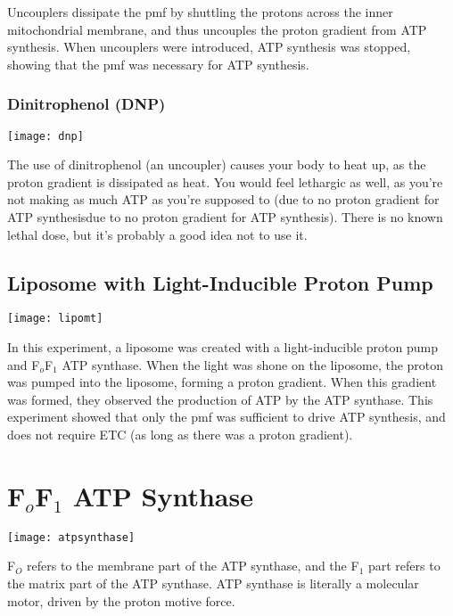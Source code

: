 Uncouplers dissipate the pmf by shuttling the protons across the inner mitochondrial membrane, and thus uncouples the proton gradient from ATP synthesis.
When uncouplers were introduced, ATP synthesis was stopped, showing that the pmf was necessary for ATP synthesis.

\subsubsection{Dinitrophenol (DNP)}

\begin{center}
\texttt{[image: dnp]}
\end{center}

The use of dinitrophenol (an uncoupler) causes your body to heat up, as the proton gradient is dissipated as heat.
You would feel lethargic as well, as you're not making as much ATP as you're supposed to (due to no proton gradient for ATP synthesisdue to no proton gradient for ATP synthesis).
There is no known lethal dose, but it's probably a good idea not to use it.

\subsection{Liposome with Light-Inducible Proton Pump}

\begin{center}
\texttt{[image: lipomt]}
\end{center}

In this experiment, a liposome was created with a light-inducible proton pump and F$_o$F$_1$ ATP synthase.
When the light was shone on the liposome, the proton was pumped into the liposome, forming a proton gradient.
When this gradient was formed, they observed the production of ATP by the ATP synthase.
This experiment showed that only the pmf was sufficient to drive ATP synthesis, and does not require ETC (as long as there was a proton gradient).

\section{F$_o$F$_1$ ATP Synthase}

\begin{center}
\texttt{[image: atpsynthase]}
\end{center}

F$_O$ refers to the membrane part of the ATP synthase, and the F$_1$ part refers to the matrix part of the ATP synthase.
ATP synthase is literally a molecular motor, driven by the proton motive force.

